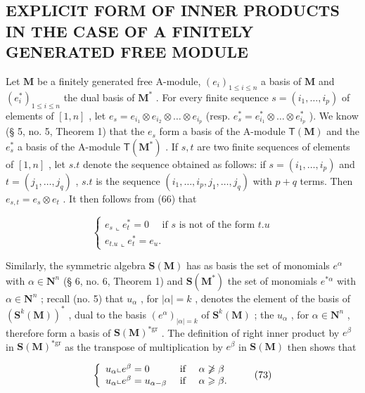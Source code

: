 \subsection{EXPLICIT FORM OF INNER PRODUCTS IN THE CASE OF A FINITELY GENERATED FREE MODULE}

Let \(\mathbf{M}\) be a finitely generated free A-module, \((e_i)_{1\leq i\leq n}\) a basis of \(\mathbf{M}\) and \((e_i^*)_{1\leq i\leq n}\) the dual basis of \(\mathbf{M}^*\) . For every finite sequence \(s = (i_1,\ldots ,i_p)\) of elements of \([1,n]\) , let \(e_s = e_{i_1}\otimes e_{i_2}\otimes \dots \otimes e_{i_p}\) (resp. \(e_s^* = e_{i_1}^*\otimes \dots \otimes e_{i_p}^*\) ). We know (§ 5, no. 5, Theorem 1) that the \(e_s\) form a basis of the A-module \(\mathsf{T}(\mathbf{M})\) and the \(e_s^*\) a basis of the A-module \(\mathsf{T}(\mathbf{M}^*)\) . If \(s,t\) are two finite sequences of elements of \([1,n]\) , let \(s.t\) denote the sequence obtained as follows: if \(s = (i_1,\ldots ,i_p)\) and \(t = (j_1,\ldots ,j_q)\) , \(s.t\) is the sequence \((i_1,\ldots ,i_p,j_1,\ldots ,j_q)\) with \(p + q\) terms. Then \(e_{s,t} = e_s\otimes e_t\) . It then follows from (66) that

\[
\left\{ \begin{array}{l} e _ {s} \llcorner e _ {t} ^ {*} = 0 \quad \text { if   } s \text {   is   not   of   the   form   } t. u \\ e _ {t. u} \llcorner e _ {t} ^ {*} = e _ {u}. \end{array} \right.\tag{72}
\]

Similarly, the symmetric algebra \(\mathbf{S}(\mathbf{M})\) has as basis the set of monomials \(e^{\alpha}\) with \(\alpha \in \mathbf{N}^{n}\) (§ 6, no. 6, Theorem 1) and \(\mathbf{S}(\mathbf{M}^{*})\) the set of monomials \(e^{*\alpha}\) with \(\alpha \in \mathbf{N}^{n}\) ; recall (no. 5) that \(u_{\alpha}\) , for \(|\alpha| = k\) , denotes the element of the basis of \((\mathbf{S}^{k}(\mathbf{M}))^{*}\) , dual to the basis \((e^{\alpha})_{|\alpha| = k}\) of \(\mathbf{S}^{k}(\mathbf{M})\) ; the \(u_{\alpha}\) , for \(\alpha \in \mathbf{N}^{n}\) , therefore form a basis of \(\mathbf{S}(\mathbf{M})^{*\mathrm{gr}}\) . The definition of right inner product by \(e^{\beta}\) in \(\mathbf{S}(\mathbf{M})^{*\mathrm{gr}}\) as the transpose of multiplication by \(e^{\beta}\) in \(\mathbf{S}(\mathbf{M})\) then shows that

\[
\left\{ \begin{array}{l l} u _ {\alpha} \llcorner e ^ {\beta} = 0 & \text { if } \quad \alpha \not \geqslant \beta \\ u _ {\alpha} \llcorner e ^ {\beta} = u _ {\alpha - \beta} & \text { if } \quad \alpha \geqslant \beta . \end{array} \right.\tag{73}
\]

